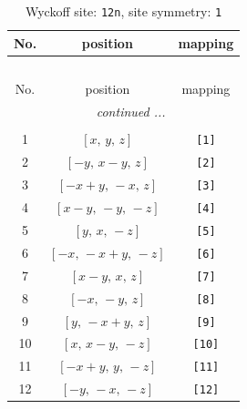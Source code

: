 \documentclass[fleqn,8pt]{jsarticle}
\begin{document}
\begin{longtable}{ccc}
\caption{Wyckoff site: {\tt 12n}, site symmetry: {\tt 1}}
 \\
 \hline \hline
No. & position & mapping \\ \hline \endfirsthead

\multicolumn{2}{l}{\tablename\ \thetable{}} \\
 \hline \hline
No. & position & mapping \\ \hline \endhead

 \hline \hline
\multicolumn{2}{r}{\footnotesize\it continued ...} \\ \endfoot

 \hline \hline
\multicolumn{2}{r}{} \\ \endlastfoot

1 & $\left[ x,\, y,\, z \right]$ & {\tt [1]} \\ \hline
2 & $\left[ - y,\, x - y,\, z \right]$ & {\tt [2]} \\ \hline
3 & $\left[ - x + y,\, - x,\, z \right]$ & {\tt [3]} \\ \hline
4 & $\left[ x - y,\, - y,\, - z \right]$ & {\tt [4]} \\ \hline
5 & $\left[ y,\, x,\, - z \right]$ & {\tt [5]} \\ \hline
6 & $\left[ - x,\, - x + y,\, - z \right]$ & {\tt [6]} \\ \hline
7 & $\left[ x - y,\, x,\, z \right]$ & {\tt [7]} \\ \hline
8 & $\left[ - x,\, - y,\, z \right]$ & {\tt [8]} \\ \hline
9 & $\left[ y,\, - x + y,\, z \right]$ & {\tt [9]} \\ \hline
10 & $\left[ x,\, x - y,\, - z \right]$ & {\tt [10]} \\ \hline
11 & $\left[ - x + y,\, y,\, - z \right]$ & {\tt [11]} \\ \hline
12 & $\left[ - y,\, - x,\, - z \right]$ & {\tt [12]} \\
\end{longtable}
\end{document}
